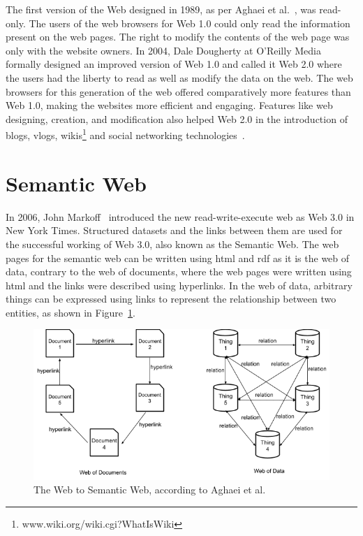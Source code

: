 \begin{doublespace}
The first version of the Web designed in 1989, as per Aghaei et al.~\cite{aghaei2012evolution}, was read-only. 
The users of the web browsers for Web 1.0 could only read the information present on the web pages. The right to modify the contents of the web page was only with the website owners. 
In 2004, Dale Dougherty at O'Reilly Media~\cite{aghaei2012evolution} formally designed an improved version of Web 1.0 and called it Web 2.0 where the users had the liberty to read as well as modify the data on the web. The web browsers for this generation of the web offered comparatively more features than Web 1.0, making the websites more efficient and engaging. Features like web designing, creation, and modification also helped Web 2.0 in the introduction of blogs, vlogs, wikis\footnote{www.wiki.org/wiki.cgi?WhatIsWiki} and social networking technologies~\cite{harris2009web}.

\section{Semantic Web}

In 2006, John Markoff~\cite{aghaei2012evolution} introduced the new read-write-execute web as Web 3.0 in New York Times. Structured datasets and the links between them are used for the successful working of Web 3.0, also known as the Semantic Web. The web pages for the semantic web can be written using \ac{html} and \ac{rdf} as it is the web of data, contrary to the web of documents, where the web pages were written using \ac{html} and the links were described using hyperlinks. In the web of data, arbitrary things can be expressed using links to represent the relationship between two entities, as shown in Figure~\ref{fig:2.2}.

\begin{figure}[htp]
    \centering
    \includegraphics[width=15cm]{images/ch2/Figure2.png}
    \caption{The Web to Semantic Web, according to Aghaei et al.~\cite{aghaei2012evolution}}
    \label{fig:2.2}
\end{figure}


\end{doublespace}
